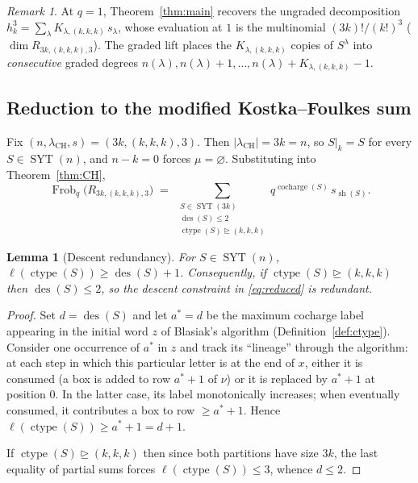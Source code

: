 \documentclass[11pt]{article}
\newtheorem{lemma}[theorem]{Lemma}
\theoremstyle{definition}
\theoremstyle{remark}
\newtheorem{remark}[theorem]{Remark}
\DeclareMathOperator{\Frob}{Frob}
\DeclareMathOperator{\ctype}{ctype}
\DeclareMathOperator{\cocharge}{cocharge}
\DeclareMathOperator{\des}{des}
\DeclareMathOperator{\sh}{sh}
\DeclareMathOperator{\SYT}{SYT}
\newcommand{\dom}{\trianglerighteq}
\begin{document}
\begin{remark}
At $q = 1$, Theorem~\ref{thm:main} recovers the ungraded decomposition
$h_k^3 = \sum_\lambda K_{\lambda,(k,k,k)}\, s_\lambda$, whose evaluation at
$1$ is the multinomial $(3k)!/(k!)^3$ ($\dim R_{3k,(k,k,k),3}$). The graded
lift places the $K_{\lambda,(k,k,k)}$ copies of $S^\lambda$ into
\emph{consecutive} graded degrees $n(\lambda), n(\lambda)+1,\ldots,
n(\lambda)+K_{\lambda,(k,k,k)}-1$.
\end{remark}

\subsection*{Reduction to the modified Kostka--Foulkes sum}

Fix $(n,\lambda_{\text{CH}},s) = (3k,(k,k,k),3)$. Then
$|\lambda_{\text{CH}}| = 3k = n$, so $S|_k = S$ for every $S \in \SYT(n)$,
and $n - k = 0$ forces $\mu = \varnothing$. Substituting into
Theorem~\ref{thm:CH},
\begin{equation}\label{eq:reduced}
    \Frob_q\bigl(R_{3k,(k,k,k),3}\bigr)
    \;=\;
    \sum_{\substack{S\in \SYT(3k)\\ \des(S)\le 2\\ \ctype(S)\dom(k,k,k)}}
        q^{\cocharge(S)}\, s_{\sh(S)}.
\end{equation}

\begin{lemma}[Descent redundancy]\label{lem:des-redund}
For $S \in \SYT(n)$, $\ell(\ctype(S)) \ge \des(S) + 1$. Consequently, if
$\ctype(S) \dom (k,k,k)$ then $\des(S) \le 2$, so the descent constraint in
\eqref{eq:reduced} is redundant.
\end{lemma}

\begin{proof}
Set $d = \des(S)$ and let $a^\ast = d$ be the maximum cocharge label
appearing in the initial word $z$ of Blasiak's algorithm
(Definition~\ref{def:ctype}). Consider one occurrence of $a^\ast$ in $z$ and
track its ``lineage'' through the algorithm: at each step in which this
particular letter is at the end of $x$, either it is consumed (a box is
added to row $a^\ast + 1$ of $\nu$) or it is replaced by $a^\ast + 1$ at
position $0$. In the latter case, its label monotonically increases; when
eventually consumed, it contributes a box to row $\ge a^\ast + 1$. Hence
$\ell(\ctype(S)) \ge a^\ast + 1 = d + 1$.

If $\ctype(S) \dom (k,k,k)$ then since both partitions have size $3k$, the
last equality of partial sums forces $\ell(\ctype(S)) \le 3$, whence
$d \le 2$.
\end{proof}
\end{document}
